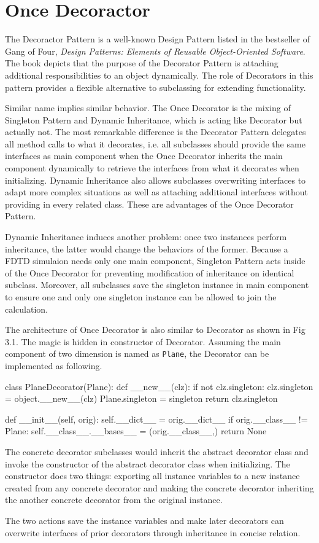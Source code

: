 \section{Once Decoractor}
The Decoractor Pattern is a well-known Design Pattern listed in the bestseller of Gang of Four, \textit{Design Patterns:
  Elements of Reusable Object-Oriented Software}. The book depicts that the purpose of the Decorator Pattern is
attaching additional responsibilities to an object dynamically. The role of Decorators in this pattern provides a
flexible alternative to subclassing for extending functionality.

Similar name implies similar behavior. The Once Decorator is the mixing of Singleton Pattern and Dynamic Inheritance,
which is acting like Decorator but actually not. The most remarkable difference is the Decorator Pattern delegates all
method calls to what it decorates, i.e. all subclasses should provide the same interfaces as main component when the
Once Decorator inherits the main component dynamically to retrieve the interfaces from what it decorates when
initializing. Dynamic Inheritance also allows subclasses overwriting interfaces to adapt more complex situations as well
as attaching additional interfaces without providing in every related class. These are advantages of the Once Decorator
Pattern.

Dynamic Inheritance induces another problem: once two instances perform inheritance, the latter would change the
behaviors of the former. Because a FDTD simulaion needs only one main component, Singleton Pattern acts inside of the
Once Decorator for preventing modification of inheritance on identical subclass. Moreover, all subclasses save the
singleton instance in main component to ensure one and only one singleton instance can be allowed to join the
calculation.

The architecture of Once Decorator is also similar to Decorator as shown in Fig 3.1. The magic is hidden in constructor
of Decorator. Assuming the main component of two dimension is named as \texttt{Plane}, the Decorator can be implemented
as following.
\begin{code}
  class PlaneDecorator(Plane):
    def __new__(clz):
        if not clz.singleton:
            clz.singleton = object.__new__(clz)
            Plane.singleton = singleton
        return clz.singleton

    def __init__(self, orig):
        self.__dict__ = orig.__dict__
        if orig.__class__ != Plane:
            self.__class__.__bases__ = (orig.__class__,)
        return None
\end{code}
The concrete decorator subclasses would inherit the abstract decorator class and invoke the constructor of the abstract
decorator class when initializing. The constructor does two things: exporting all instance variables to a new instance
created from any concrete decorator and making the concrete decorator inheriting the another concrete decorator from the
original instance.

The two actions save the instance variables and make later decorators can overwrite interfaces of prior decorators
through inheritance in concise relation.
